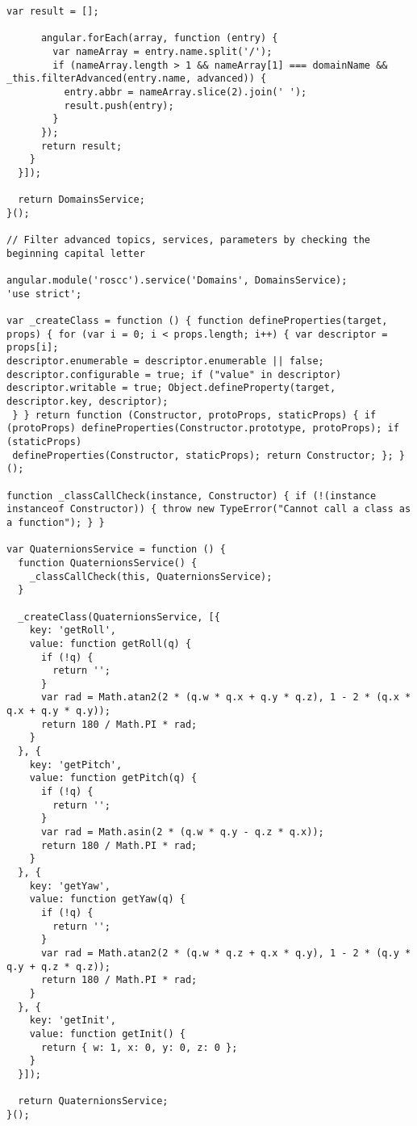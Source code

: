 \begin{lstlisting}[breaklines=true,basicstyle=\tiny]
      var result = [];

      angular.forEach(array, function (entry) {
        var nameArray = entry.name.split('/');
        if (nameArray.length > 1 && nameArray[1] === domainName && _this.filterAdvanced(entry.name, advanced)) {
          entry.abbr = nameArray.slice(2).join(' ');
          result.push(entry);
        }
      });
      return result;
    }
  }]);

  return DomainsService;
}();

// Filter advanced topics, services, parameters by checking the beginning capital letter

angular.module('roscc').service('Domains', DomainsService);
'use strict';

var _createClass = function () { function defineProperties(target, props) { for (var i = 0; i < props.length; i++) { var descriptor = props[i]; 
descriptor.enumerable = descriptor.enumerable || false; descriptor.configurable = true; if ("value" in descriptor) 
descriptor.writable = true; Object.defineProperty(target, descriptor.key, descriptor);
 } } return function (Constructor, protoProps, staticProps) { if (protoProps) defineProperties(Constructor.prototype, protoProps); if (staticProps) 
 defineProperties(Constructor, staticProps); return Constructor; }; }();

function _classCallCheck(instance, Constructor) { if (!(instance instanceof Constructor)) { throw new TypeError("Cannot call a class as a function"); } }

var QuaternionsService = function () {
  function QuaternionsService() {
    _classCallCheck(this, QuaternionsService);
  }

  _createClass(QuaternionsService, [{
    key: 'getRoll',
    value: function getRoll(q) {
      if (!q) {
        return '';
      }
      var rad = Math.atan2(2 * (q.w * q.x + q.y * q.z), 1 - 2 * (q.x * q.x + q.y * q.y));
      return 180 / Math.PI * rad;
    }
  }, {
    key: 'getPitch',
    value: function getPitch(q) {
      if (!q) {
        return '';
      }
      var rad = Math.asin(2 * (q.w * q.y - q.z * q.x));
      return 180 / Math.PI * rad;
    }
  }, {
    key: 'getYaw',
    value: function getYaw(q) {
      if (!q) {
        return '';
      }
      var rad = Math.atan2(2 * (q.w * q.z + q.x * q.y), 1 - 2 * (q.y * q.y + q.z * q.z));
      return 180 / Math.PI * rad;
    }
  }, {
    key: 'getInit',
    value: function getInit() {
      return { w: 1, x: 0, y: 0, z: 0 };
    }
  }]);

  return QuaternionsService;
}();


\end{lstlisting}
